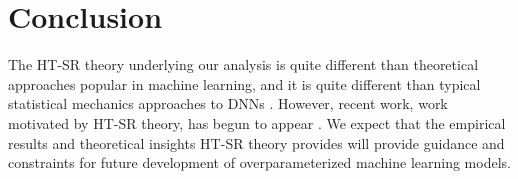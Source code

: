 \documentclass{article}
\newcommand{\charles}[1]{{\color{blue}\sf{[Charles: #1]}}}
\begin{document}


\section*{Conclusion}

The HT-SR theory underlying our analysis is quite different than theoretical approaches popular in machine learning, and it is quite different than typical statistical mechanics approaches to DNNs \citep{BKPx20}.
%
%
However, recent work, work motivated by HT-SR theory, has begun to appear
\citep{HodMah20A_TR,GSZ20_TR, ZCM20_TR, DLM19_Exact_TR, TKM20_TR, LEHM21_TR,Mah12, DKM20_TR}. 
We expect that the empirical results and theoretical insights HT-SR theory provides will provide guidance and constraints for future development of overparameterized machine learning models.





\end{document}
